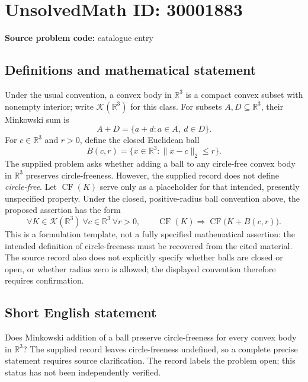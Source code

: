 \documentclass[11pt]{article}
\newcommand{\R}{\mathbb{R}}
\begin{document}
\section*{UnsolvedMath ID: 30001883}
\textbf{Source problem code:} catalogue entry
\subsection{Definitions and mathematical statement}
Under the usual convention, a convex body in \(\R^3\) is a compact convex subset with nonempty interior; write \(\mathcal K(\R^3)\) for this class. For subsets \(A,D\subseteq\R^3\), their Minkowski sum is
\[
A+D=\{a+d:a\in A,\ d\in D\}.
\]
For \(c\in\R^3\) and \(r>0\), define the closed Euclidean ball
\[
B(c,r)=\{x\in\R^3:\|x-c\|_2\le r\}.
\]
The supplied problem asks whether adding a ball to any circle-free convex body in \(\R^3\) preserves circle-freeness. However, the supplied record does not define \emph{circle-free}. Let \(\operatorname{CF}(K)\) serve only as a placeholder for that intended, presently unspecified property. Under the closed, positive-radius ball convention above, the proposed assertion has the form
\[
\forall K\in\mathcal K(\R^3)\ \forall c\in\R^3\ \forall r>0,\qquad
\operatorname{CF}(K)\Longrightarrow\operatorname{CF}\bigl(K+B(c,r)\bigr).
\]
This is a formulation template, not a fully specified mathematical assertion: the intended definition of circle-freeness must be recovered from the cited material. The source record also does not explicitly specify whether balls are closed or open, or whether radius zero is allowed; the displayed convention therefore requires confirmation.
\subsection{Short English statement}
Does Minkowski addition of a ball preserve circle-freeness for every convex body in \(\R^3\)? The supplied record leaves circle-freeness undefined, so a complete precise statement requires source clarification. The record labels the problem open; this status has not been independently verified.
\end{document}
